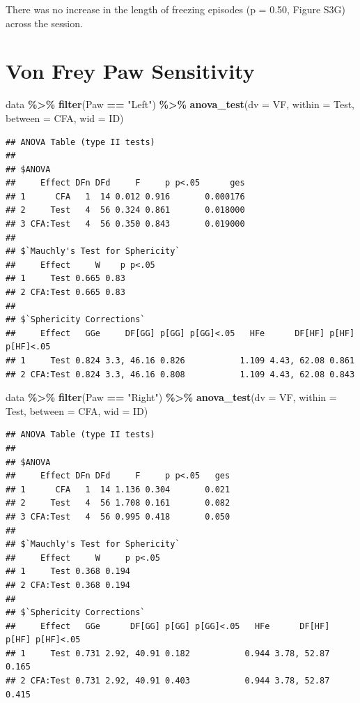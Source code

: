 \documentclass[
]{book}
\newenvironment{Shaded}{\begin{snugshade}}{\end{snugshade}}
\newcommand{\AttributeTok}[1]{\textcolor[rgb]{0.13,0.29,0.53}{#1}}
\newcommand{\FunctionTok}[1]{\textcolor[rgb]{0.13,0.29,0.53}{\textbf{#1}}}
\newcommand{\NormalTok}[1]{#1}
\newcommand{\SpecialCharTok}[1]{\textcolor[rgb]{0.81,0.36,0.00}{\textbf{#1}}}
\newcommand{\StringTok}[1]{\textcolor[rgb]{0.31,0.60,0.02}{#1}}
\begin{document}
There was no increase in the length of freezing episodes (p = 0.50, Figure S3G) across the session.

\section*{Von Frey Paw Sensitivity}\label{von-frey-paw-sensitivity}

\begin{Shaded}
\begin{Highlighting}[]
\NormalTok{data }\SpecialCharTok{\%\textgreater{}\%}
  \FunctionTok{filter}\NormalTok{(Paw }\SpecialCharTok{==} \StringTok{"Left"}\NormalTok{) }\SpecialCharTok{\%\textgreater{}\%}
  \FunctionTok{anova\_test}\NormalTok{(}\AttributeTok{dv =}\NormalTok{  VF, }\AttributeTok{within =}\NormalTok{ Test, }\AttributeTok{between =}\NormalTok{ CFA, }\AttributeTok{wid =}\NormalTok{ ID)}
\end{Highlighting}
\end{Shaded}

\begin{verbatim}
## ANOVA Table (type II tests)
## 
## $ANOVA
##     Effect DFn DFd     F     p p<.05      ges
## 1      CFA   1  14 0.012 0.916       0.000176
## 2     Test   4  56 0.324 0.861       0.018000
## 3 CFA:Test   4  56 0.350 0.843       0.019000
## 
## $`Mauchly's Test for Sphericity`
##     Effect     W    p p<.05
## 1     Test 0.665 0.83      
## 2 CFA:Test 0.665 0.83      
## 
## $`Sphericity Corrections`
##     Effect   GGe     DF[GG] p[GG] p[GG]<.05   HFe      DF[HF] p[HF] p[HF]<.05
## 1     Test 0.824 3.3, 46.16 0.826           1.109 4.43, 62.08 0.861          
## 2 CFA:Test 0.824 3.3, 46.16 0.808           1.109 4.43, 62.08 0.843
\end{verbatim}

\begin{Shaded}
\begin{Highlighting}[]
\NormalTok{data }\SpecialCharTok{\%\textgreater{}\%}
  \FunctionTok{filter}\NormalTok{(Paw }\SpecialCharTok{==} \StringTok{"Right"}\NormalTok{) }\SpecialCharTok{\%\textgreater{}\%}
  \FunctionTok{anova\_test}\NormalTok{(}\AttributeTok{dv =}\NormalTok{  VF, }\AttributeTok{within =}\NormalTok{ Test, }\AttributeTok{between =}\NormalTok{ CFA, }\AttributeTok{wid =}\NormalTok{ ID)}
\end{Highlighting}
\end{Shaded}

\begin{verbatim}
## ANOVA Table (type II tests)
## 
## $ANOVA
##     Effect DFn DFd     F     p p<.05   ges
## 1      CFA   1  14 1.136 0.304       0.021
## 2     Test   4  56 1.708 0.161       0.082
## 3 CFA:Test   4  56 0.995 0.418       0.050
## 
## $`Mauchly's Test for Sphericity`
##     Effect     W     p p<.05
## 1     Test 0.368 0.194      
## 2 CFA:Test 0.368 0.194      
## 
## $`Sphericity Corrections`
##     Effect   GGe      DF[GG] p[GG] p[GG]<.05   HFe      DF[HF] p[HF] p[HF]<.05
## 1     Test 0.731 2.92, 40.91 0.182           0.944 3.78, 52.87 0.165          
## 2 CFA:Test 0.731 2.92, 40.91 0.403           0.944 3.78, 52.87 0.415
\end{verbatim}
\end{document}
